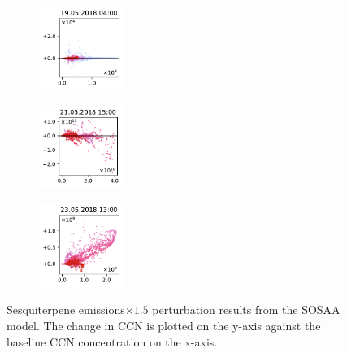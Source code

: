 \begin{figure}[H]
    \begin{subfigure}
        \centering
        \includegraphics[width=0.30\textwidth,valign=t]{evaluation/figures/perturbations/perturbation-19.05.2018:04.00-sesquiterpenes-mul-1.5.pdf}
    \end{subfigure}
    \begin{subfigure}
        \centering
        \includegraphics[width=0.30\textwidth,valign=t]{evaluation/figures/perturbations/perturbation-21.05.2018:15.00-sesquiterpenes-mul-1.5.pdf}
    \end{subfigure}
    \begin{subfigure}
        \centering
        \includegraphics[width=0.30\textwidth,valign=t]{evaluation/figures/perturbations/perturbation-23.05.2018:13.00-sesquiterpenes-mul-1.5.pdf}
    \end{subfigure}
    
    \caption[Sesquiterpene emissions$\times 1.5$ perturbation SOSAA results]{Sesquiterpene emissions$\times 1.5$ perturbation results from the SOSAA model. The change in CCN is plotted on the y-axis against the baseline CCN concentration on the x-axis.}
    \label{fig:sosaa-perturbation-sesquiterpenes-mul-1.5}
\end{figure}


